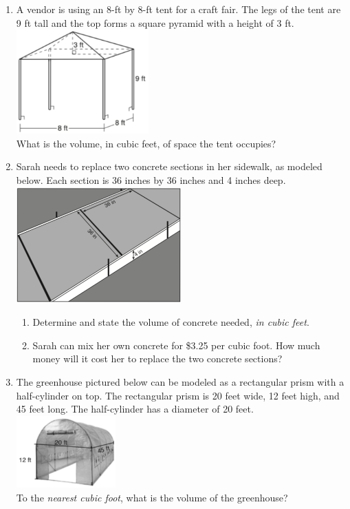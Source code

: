 \documentclass[12pt, twoside]{article}
\begin{document}
\begin{enumerate}
\item A vendor is using an 8-ft by 8-ft tent for a craft fair. The legs of the tent are 9 ft tall and the top forms a square pyramid with a height of 3 ft.\\[1cm]
    \includegraphics[width=0.4\textwidth]{tent_Jan2019-9.png}\\[0.5cm]
    What is the volume, in cubic feet, of space the tent occupies? \vspace{3cm}

\newpage
\item Sarah needs to replace two concrete sections in her sidewalk, as modeled below. Each section is 36 inches by 36 inches and 4 inches deep.\\[0.25cm]
    \includegraphics[width=0.5\textwidth]{walk_Aug2018-31.png}
      \begin{enumerate}
        \item Determine and state the volume of concrete needed, \emph{in cubic feet}. \vspace{1.5cm}
        \item Sarah can mix her own concrete for \$3.25 per cubic foot. How much money will it cost her to replace the two concrete sections?
    \end{enumerate} \vspace{2.5cm}

\item The greenhouse pictured below can be modeled as a rectangular prism with a half-cylinder on top. The rectangular prism is 20 feet wide, 12 feet high, and 45 feet long. The half-cylinder has a diameter of 20 feet.\\[0.5cm]
    \includegraphics[width=0.3\textwidth]{greenhouse_Jun2018-7.png}\\
    To the \emph{nearest cubic foot}, what is the volume of the greenhouse?



\end{enumerate}
\end{document}
